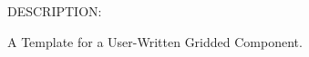  
\setlength{\oldparskip}{\parskip}
\setlength{\parskip}{1.5ex}
\setlength{\oldparindent}{\parindent}
\setlength{\parindent}{0pt}
\setlength{\oldbaselineskip}{\baselineskip}
\setlength{\baselineskip}{11pt}
 
\def\bv{\begin{verbatim}}
\def\ev{\end{verbatim}}
\def\be{\begin{equation}}
\def\ee{\end{equation}}
\def\bea{\begin{eqnarray}}
\def\eea{\end{eqnarray}}
\def\bi{\begin{itemize}}
\def\ei{\end{itemize}}
\def\bn{\begin{enumerate}}
\def\en{\end{enumerate}}
\def\bd{\begin{description}}
\def\ed{\end{description}}
\def\({\left (}
\def\){\right )}
\def\[{\left [}
\def\]{\right ]}
\def\<{\left  \langle}
\def\>{\right \rangle}
\def\cI{{\cal I}}
\def\diag{\mathop{\rm diag}}
\def\tr{\mathop{\rm tr}}


 

  
{\sf DESCRIPTION:\\ }


    A Template for a User-Written Gridded Component.
  
